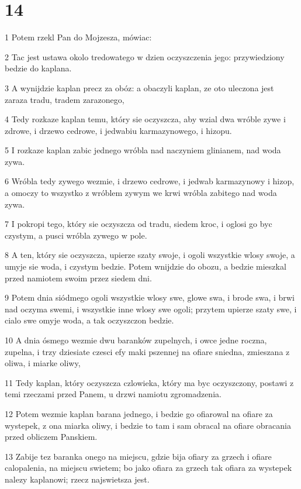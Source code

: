 \chapter{14}

\par 1 Potem rzekl Pan do Mojzesza, mówiac:
\par 2 Tac jest ustawa okolo tredowatego w dzien oczyszczenia jego: przywiedziony bedzie do kaplana.
\par 3 A wynijdzie kaplan precz za obóz: a obaczyli kaplan, ze oto uleczona jest zaraza tradu, tradem zarazonego,
\par 4 Tedy rozkaze kaplan temu, który sie oczyszcza, aby wzial dwa wróble zywe i zdrowe, i drzewo cedrowe, i jedwabiu karmazynowego, i hizopu.
\par 5 I rozkaze kaplan zabic jednego wróbla nad naczyniem glinianem, nad woda zywa.
\par 6 Wróbla tedy zywego wezmie, i drzewo cedrowe, i jedwab karmazynowy i hizop, a omoczy to wszystko z wróblem zywym we krwi wróbla zabitego nad woda zywa.
\par 7 I pokropi tego, który sie oczyszcza od tradu, siedem kroc, i oglosi go byc czystym, a pusci wróbla zywego w pole.
\par 8 A ten, który sie oczyszcza, upierze szaty swoje, i ogoli wszystkie wlosy swoje, a umyje sie woda, i czystym bedzie. Potem wnijdzie do obozu, a bedzie mieszkal przed namiotem swoim przez siedem dni.
\par 9 Potem dnia siódmego ogoli wszystkie wlosy swe, glowe swa, i brode swa, i brwi nad oczyma swemi, i wszystkie inne wlosy swe ogoli; przytem upierze szaty swe, i cialo swe omyje woda, a tak oczyszczon bedzie.
\par 10 A dnia ósmego wezmie dwu baranków zupelnych, i owce jedne roczna, zupelna, i trzy dziesiate czesci efy maki pszennej na ofiare sniedna, zmieszana z oliwa, i miarke oliwy,
\par 11 Tedy kaplan, który oczyszcza czlowieka, który ma byc oczyszczony, postawi z temi rzeczami przed Panem, u drzwi namiotu zgromadzenia.
\par 12 Potem wezmie kaplan barana jednego, i bedzie go ofiarowal na ofiare za wystepek, z ona miarka oliwy, i bedzie to tam i sam obracal na ofiare obracania przed obliczem Panskiem.
\par 13 Zabije tez baranka onego na miejscu, gdzie bija ofiary za grzech i ofiare calopalenia, na miejscu swietem; bo jako ofiara za grzech tak ofiara za wystepek nalezy kaplanowi; rzecz najswietsza jest.
